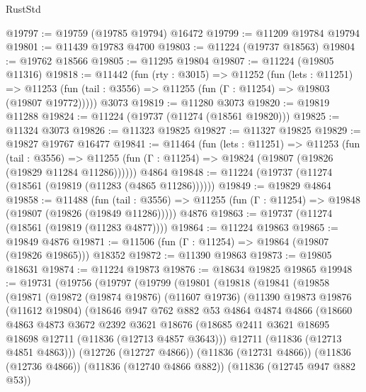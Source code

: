 \begin{lexlean}{RustStd}
\begin{coremodule}
@19797 := @19759 (@19785 @19794) @16472
@19799 := @11209 @19784 @19794
@19801 := @11439 @19783 @4700
@19803 := @11224 (@19737 @18563)
@19804 := @19762 @18566
@19805 := @11295 @19804
@19807 := @11224 (@19805 @11316)
@19818 := @11442
    (fun (rty : @3015) =>
    @11252
      (fun (lets : @11251) =>
      @11253 (fun (tail : @3556) => @11255 (fun (Γ : @11254) => @19803 (@19807 @19772)))))
    @3073
@19819 := @11280 @3073
@19820 := @19819 @11288
@19824 := @11224 (@19737 (@11274 (@18561 @19820)))
@19825 := @11324 @3073
@19826 := @11323 @19825
@19827 := @11327 @19825
@19829 := @19827 @19767 @16477
@19841 := @11464
    (fun (lets : @11251) =>
    @11253
      (fun (tail : @3556) =>
      @11255 (fun (Γ : @11254) => @19824 (@19807 (@19826 (@19829 @11284 @11286))))))
    @4864
@19848 := @11224 (@19737 (@11274 (@18561 (@19819 (@11283 (@4865 @11286))))))
@19849 := @19829 @4864
@19858 := @11488
    (fun (tail : @3556) => @11255 (fun (Γ : @11254) => @19848 (@19807 (@19826 (@19849 @11286)))))
    @4876
@19863 := @19737 (@11274 (@18561 (@19819 (@11283 @4877))))
@19864 := @11224 @19863
@19865 := @19849 @4876
@19871 := @11506 (fun (Γ : @11254) => @19864 (@19807 (@19826 @19865))) @18352
@19872 := @11390 @19863
@19873 := @19805 @18631
@19874 := @11224 @19873
@19876 := @18634 @19825 @19865
@19948 := @19731
    (@19756
      (@19797
        (@19799
          (@19801
            (@19818
              (@19841
                (@19858
                  (@19871
                    (@19872
                      (@19874 @19876)
                      (@11607 @19736)
                      (@11390
                        @19873
                        @19876
                        (@11612 @19804)
                        (@18646
                          @947
                          @762
                          @882
                          @53
                          @4864
                          @4874
                          @4866
                          (@18660
                            @4863
                            @4873
                            @3672
                            @2392
                            @3621
                            @18676
                            (@18685 @2411 @3621 @18695 @18698 @12711 (@11836 (@12713 @4857 @3643)))
                            @12711
                            (@11836 (@12713 @4851 @4863)))
                          (@12726 (@12727 @4866))
                          (@11836 (@12731 @4866))
                          (@11836 (@12736 @4866))
                          (@11836 (@12740 @4866 @882))
                          (@11836 (@12745 @947 @882 @53))

\end{coremodule}
\end{lexlean}
